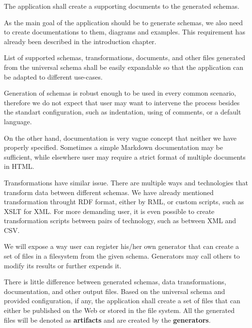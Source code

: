 
\begin{requirement}
    The application shall create a supporting documents to the generated schemas.
\end{requirement}

As the main goal of the application should be to generate schemas, we also need to create documentations to them, diagrams and examples. This requirement has already been described in the introduction chapter. %


\begin{requirement}
    List of supported schemas, transformations, documents, and other files generated from the universal schema shall be easily expandable so that the application can be adapted to different use-cases.
\end{requirement}

Generation of schemas is robust enough to be used in every common scenario, therefore we do not expect that user may want to intervene the process besides the standart configuration, such as indentation, using of comments, or a default language.

On the other hand, documentation is very vague concept that neither we have properly specified. Sometimes a simple Markdown documentation may be sufficient, while elsewhere user may require a strict format of multiple documents in HTML.

Transformations have similar issue. There are multiple ways and technologies that transform data between different schemas. We have already mentioned transformation throught RDF format, either by RML, or custom scripts, such as XSLT for XML. For more demanding user, it is even possible to create transformation scripts between pairs of technology, such as between XML and CSV.

We will expose a way user can register his/her own generator that can create a set of files in a filesystem from the given schema. Generators may call others to modify its results or further expends it.

\bigskip

There is little difference between generated schemas, data transformations, documentation, and other output files. Based on the universal schema and provided configuration, if any, the application shall create a set of files that can either be published on the Web or stored in the file system. All the generated files will be denoted as \textbf{artifacts} and are created by the \textbf{generators}.

